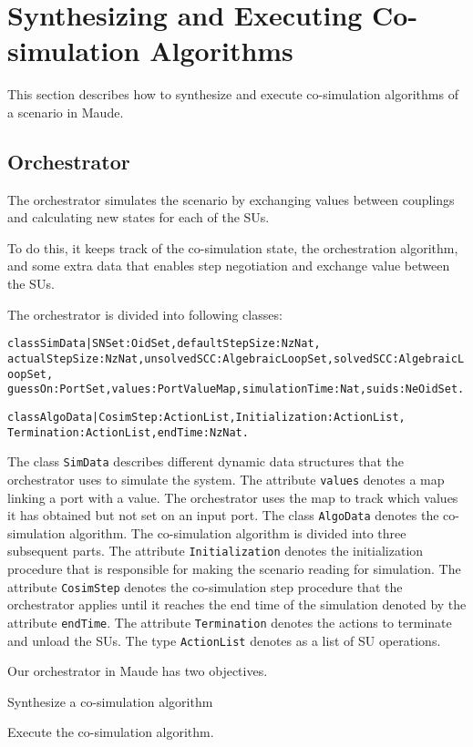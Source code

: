 \section{Synthesizing and Executing Co-simulation Algorithms}\label{sc:sc:synthesize}
This section describes how to synthesize and execute co-simulation algorithms of a scenario in Maude.

\subsection{Orchestrator}
The orchestrator simulates the scenario by exchanging values between couplings and calculating new states for each of the SUs.

To do this, it keeps track of the co-simulation state, the orchestration algorithm, and some extra data that enables step negotiation and exchange value between the SUs.

The orchestrator is divided into following classes:
\begin{alltt}
\small
class SimData | SNSet : OidSet, defaultStepSize : NzNat,
 actualStepSize : NzNat, unsolvedSCC : AlgebraicLoopSet, solvedSCC : AlgebraicLoopSet,
  guessOn : PortSet, values : PortValueMap, simulationTime : Nat,suids : NeOidSet .

class AlgoData | CosimStep : ActionList, Initialization : ActionList, 
Termination : ActionList, endTime : NzNat .
\end{alltt}

The class \texttt{SimData} describes different dynamic data structures that the orchestrator uses to simulate the system. 
The attribute \texttt{values} denotes a map linking a port with a value. 
The orchestrator uses the map to track which values it has obtained but not set on an input port. 
The class \texttt{AlgoData} denotes the co-simulation algorithm.
The co-simulation algorithm is divided into three subsequent parts.
The attribute \texttt{Initialization} denotes the initialization procedure that is responsible for making the scenario reading for simulation.
The attribute \texttt{CosimStep} denotes the co-simulation step procedure that the orchestrator applies until it reaches the end time of the simulation denoted by the attribute \texttt{endTime}.
The attribute \texttt{Termination} denotes the actions to terminate and unload the SUs.
The type \texttt{ActionList} denotes as a list of SU operations.

Our orchestrator in Maude has two objectives.
\begin{compactenum}
  \item Synthesize a co-simulation algorithm
  \item Execute the co-simulation algorithm.
\end{compactenum}

